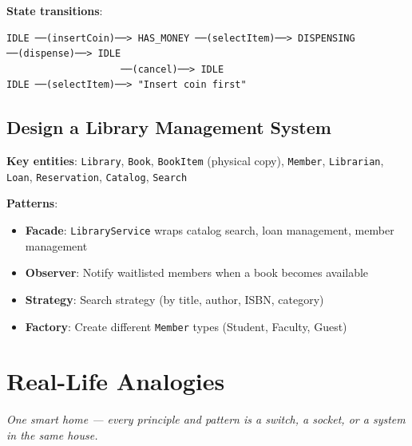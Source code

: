 \documentclass[11pt]{article}
\providecommand{\tightlist}{\setlength{\itemsep}{1pt}\setlength{\parskip}{0pt}}
\begin{document}
\textbf{State transitions}:

\setcodelang{}

\begin{verbatim}
IDLE ──(insertCoin)──> HAS_MONEY ──(selectItem)──> DISPENSING ──(dispense)──> IDLE
                    ──(cancel)──> IDLE
IDLE ──(selectItem)──> "Insert coin first"
\end{verbatim}

\subsection{Design a Library Management System}\label{design-a-library-management-system}

\textbf{Key entities}: \texttt{Library}, \texttt{Book}, \texttt{BookItem} (physical copy), \texttt{Member}, \texttt{Librarian}, \texttt{Loan}, \texttt{Reservation}, \texttt{Catalog}, \texttt{Search}

\textbf{Patterns}:

\begin{itemize}
\tightlist
\item
  \textbf{Facade}: \texttt{LibraryService} wraps catalog search, loan management, member management
\item
  \textbf{Observer}: Notify waitlisted members when a book becomes available
\item
  \textbf{Strategy}: Search strategy (by title, author, ISBN, category)
\item
  \textbf{Factory}: Create different \texttt{Member} types (Student, Faculty, Guest)
\end{itemize}

\section{Real-Life Analogies}\label{real-life-analogies}

\emph{One smart home --- every principle and pattern is a switch, a socket, or a system in the same house.}
\end{document}
